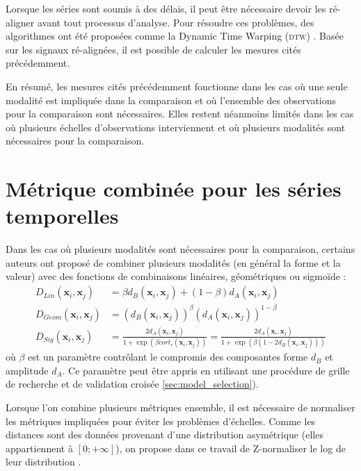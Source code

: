Lorsque les séries sont soumis à des délais, il peut être nécessaire devoir les ré-aligner avant tout processus d'analyse. Pour résoudre ces problèmes, des algorithmes ont été proposées comme la 
Dynamic Time Warping (\textsc{dtw}) \cite{Keogh2004,Salvador}. Basée sur les signaux ré-alignées, il est possible de calculer les mesures cités précédemment.

En résumé, les mesures cités précédemment fonctionne dans les cas où une seule modalité est impliquée dans la comparaison et où l'ensemble des observations pour la comparaison sont nécessaires. Elles restent néanmoins limités dans les cas où plusieurs échelles d'observations interviennent et où plusieurs modalités sont nécessaires pour la comparaison.




\section*{Métrique combinée pour les séries temporelles}
Dans les cas où plusieurs modalités sont nécessaires pour la comparaison, certains auteurs ont proposé de combiner plusieurs modalités (en général la forme et la valeur) avec des fonctions de combinaisons linéaires, géométriques ou sigmoïde \cite{AhlameDouzal-Chouakria2012,Chouakria2007} :
\begin{align}
	D_{Lin}(\textbf{x}_i,\textbf{x}_j) &= \beta d_{B}(\textbf{x}_i,\textbf{x}_j) + (1-\beta) d_A(\textbf{x}_i,\textbf{x}_j)  \label{eq:DLin}   \\
	D_{Geom}(\textbf{x}_i,\textbf{x}_j) &= (d_{B}(\textbf{x}_i,\textbf{x}_j))^\beta  (d_A(\textbf{x}_i,\textbf{x}_j))^{1-\beta} \label{eq:DGeom} \\
	D_{Sig}(\textbf{x}_i,\textbf{x}_j) &= \frac{2d_A(\textbf{x}_i,\textbf{x}_j)}{1+\exp(\beta cort_r(\textbf{x}_i,\textbf{x}_j))}
	= \frac{2d_A(\textbf{x}_i,\textbf{x}_j)}{1+\exp(\beta (1-2d_B(\textbf{x}_i,\textbf{x}_j)))}
	\label{eq:DSig}
\end{align}
\noindent où $\beta$ est un paramètre contrôlant le compromis des composantes forme $d_B$ et amplitude $d_A$. Ce paramètre peut être appris en utilisant une procédure de grille de recherche et de validation croisée \ref{sec:model_selection}).

Lorsque l'on combine plusieurs métriques ensemble, il est nécessaire de normaliser les métriques impliquées pour éviter les problèmes d'échelles. Comme les distances sont des données provenant d'une distribution asymétrique (elles appartiennent à $[0;+\infty]$), on propose dans ce travail de Z-normaliser le log de leur distribution \cite{Zumel}.